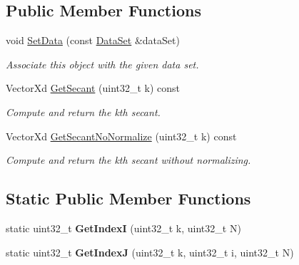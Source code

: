 \subsection*{Public Member Functions}
\begin{DoxyCompactItemize}
\item 
\hypertarget{struct_d_r_d_s_p_1_1_secants_data_a1c1383e3f4eca99473eba63d7a50a024}{void \hyperlink{struct_d_r_d_s_p_1_1_secants_data_a1c1383e3f4eca99473eba63d7a50a024}{Set\-Data} (const \hyperlink{struct_d_r_d_s_p_1_1_data_set}{Data\-Set} \&data\-Set)}\label{struct_d_r_d_s_p_1_1_secants_data_a1c1383e3f4eca99473eba63d7a50a024}

\begin{DoxyCompactList}\small\item\em Associate this object with the given data set. \end{DoxyCompactList}\item 
\hypertarget{struct_d_r_d_s_p_1_1_secants_data_a7b94a05552fbbf08335ff1d4270ef13a}{Vector\-Xd \hyperlink{struct_d_r_d_s_p_1_1_secants_data_a7b94a05552fbbf08335ff1d4270ef13a}{Get\-Secant} (uint32\-\_\-t k) const }\label{struct_d_r_d_s_p_1_1_secants_data_a7b94a05552fbbf08335ff1d4270ef13a}

\begin{DoxyCompactList}\small\item\em Compute and return the kth secant. \end{DoxyCompactList}\item 
\hypertarget{struct_d_r_d_s_p_1_1_secants_data_a208053eededd620c2e32633aeb1ccb65}{Vector\-Xd \hyperlink{struct_d_r_d_s_p_1_1_secants_data_a208053eededd620c2e32633aeb1ccb65}{Get\-Secant\-No\-Normalize} (uint32\-\_\-t k) const }\label{struct_d_r_d_s_p_1_1_secants_data_a208053eededd620c2e32633aeb1ccb65}

\begin{DoxyCompactList}\small\item\em Compute and return the kth secant without normalizing. \end{DoxyCompactList}\end{DoxyCompactItemize}
\subsection*{Static Public Member Functions}
\begin{DoxyCompactItemize}
\item 
\hypertarget{struct_d_r_d_s_p_1_1_secants_data_abd9b205c7f0555f87195b241225e988b}{static uint32\-\_\-t {\bfseries Get\-Index\-I} (uint32\-\_\-t k, uint32\-\_\-t N)}\label{struct_d_r_d_s_p_1_1_secants_data_abd9b205c7f0555f87195b241225e988b}

\item 
\hypertarget{struct_d_r_d_s_p_1_1_secants_data_a7a609eef6b36cdd56d4920e312cc310e}{static uint32\-\_\-t {\bfseries Get\-Index\-J} (uint32\-\_\-t k, uint32\-\_\-t i, uint32\-\_\-t N)}\label{struct_d_r_d_s_p_1_1_secants_data_a7a609eef6b36cdd56d4920e312cc310e}

\end{DoxyCompactItemize}
